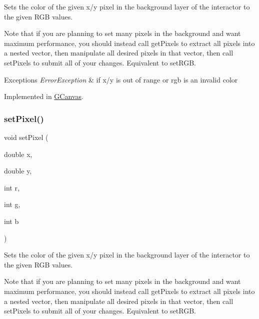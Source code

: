 Sets the color of the given x/y pixel in the background layer of the interactor to the given R\+GB values. 

Note that if you are planning to set many pixels in the background and want maximum performance, you should instead call get\+Pixels to extract all pixels into a nested vector, then manipulate all desired pixels in that vector, then call set\+Pixels to submit all of your changes. Equivalent to set\+R\+GB.


\begin{DoxyExceptions}{Exceptions}
{\em Error\+Exception} & if x/y is out of range or rgb is an invalid color \\
\hline
\end{DoxyExceptions}


Implemented in \mbox{\hyperlink{classsgl_1_1GCanvas_a05b3441e912e4c0ed45e9ed43bb745d1}{G\+Canvas}}.

\mbox{\label{classsgl_1_1GDrawingSurface_aec90e927c9da286214908d3f9da685d7}} 
\subsubsection{\texorpdfstring{set\+Pixel()}{setPixel()}\hspace{0.1cm}{\footnotesize\ttfamily [2/3]}}
{\footnotesize\ttfamily void set\+Pixel (\begin{DoxyParamCaption}\item[{double}]{x,  }\item[{double}]{y,  }\item[{int}]{r,  }\item[{int}]{g,  }\item[{int}]{b }\end{DoxyParamCaption})\hspace{0.3cm}{\ttfamily [virtual]}}



Sets the color of the given x/y pixel in the background layer of the interactor to the given R\+GB values. 

Note that if you are planning to set many pixels in the background and want maximum performance, you should instead call get\+Pixels to extract all pixels into a nested vector, then manipulate all desired pixels in that vector, then call set\+Pixels to submit all of your changes. Equivalent to set\+R\+GB.


